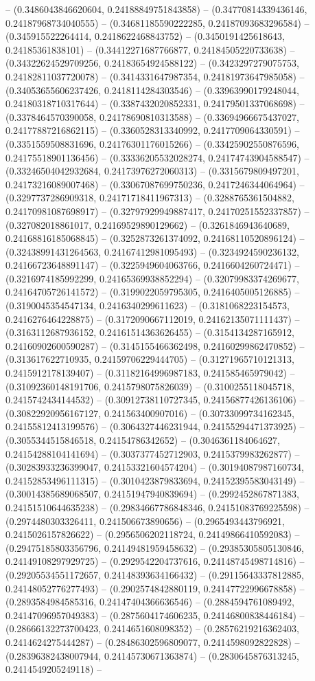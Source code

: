 -- (0.3486043846620604, 0.24188849751843858) -- (0.34770814339436146, 0.24187968734040555) -- (0.34681185590222285, 0.24187093683296584) -- (0.345915522264414, 0.2418622468843752) -- (0.3450191425618643, 0.24185361838101) -- (0.34412271687766877, 0.24184505220733638) -- (0.34322624529709256, 0.24183654924588122) -- (0.3423297279075753, 0.24182811037720078) -- (0.3414331647987354, 0.24181973647985058) -- (0.34053655606237426, 0.2418114284303546) -- (0.33963990179248044, 0.24180318710317644) -- (0.3387432020852331, 0.24179501337068698) -- (0.3378464570390058, 0.24178690810313588) -- (0.33694966675437027, 0.24177887216862115) -- (0.3360528313340992, 0.2417709064330591) -- (0.3351559508831696, 0.24176301176015266) -- (0.33425902550876596, 0.24175518901136456) -- (0.33336205532028274, 0.24174743904588547) -- (0.33246504042932684, 0.24173976272060313) -- (0.3315679809497201, 0.24173216089007468) -- (0.33067087699750236, 0.2417246344064964) -- (0.3297737286909318, 0.24171718411967313) -- (0.3288765361504882, 0.24170981087698917) -- (0.32797929949887417, 0.24170251552337857) -- (0.327082018861017, 0.24169529890129662) -- (0.3261846943640689, 0.24168816185068845) -- (0.3252873261374092, 0.24168110520896124) -- (0.32438991431264563, 0.24167412981095493) -- (0.3234924590236132, 0.24166723648891147) -- (0.3225949604063766, 0.2416604260724471) -- (0.3216974185992299, 0.24165369938852294) -- (0.32079983374269677, 0.24164705726141572) -- (0.3199022059795305, 0.2416405005126885) -- (0.3190045354547134, 0.2416340299611623) -- (0.3181068223154573, 0.2416276464228875) -- (0.3172090667112019, 0.24162135071111437) -- (0.3163112687936152, 0.24161514363626455) -- (0.3154134287165912, 0.24160902600590287) -- (0.3145155466362498, 0.24160299862470852) -- (0.313617622710935, 0.24159706229444705) -- (0.31271965710121313, 0.2415912178139407) -- (0.31182164996987183, 0.241585465979042) -- (0.31092360148191706, 0.2415798075826039) -- (0.3100255118045718, 0.2415742434144532) -- (0.30912738110727345, 0.24156877426136106) -- (0.30822920956167127, 0.241563400907016) -- (0.30733099734162345, 0.24155812413199576) -- (0.3064327446231944, 0.24155294471373925) -- (0.3055344515846518, 0.24154786342652) -- (0.3046361184064627, 0.24154288104141694) -- (0.3037377452712903, 0.2415379983262877) -- (0.30283933236399047, 0.24153321604574204) -- (0.30194087987160734, 0.24152853496111315) -- (0.3010423879833694, 0.24152395583043149) -- (0.30014385689068507, 0.24151947940839694) -- (0.2992452867871383, 0.24151510644635238) -- (0.29834667786848346, 0.24151083769225598) -- (0.2974480303326411, 0.241506673890656) -- (0.2965493443796921, 0.2415026157826622) -- (0.2956506202118724, 0.24149866410592083) -- (0.29475185803356796, 0.24149481959458632) -- (0.29385305805130846, 0.24149108297929725) -- (0.2929542204737616, 0.24148745498714816) -- (0.29205534551172657, 0.24148393634166432) -- (0.29115643337812885, 0.24148052776277493) -- (0.2902574842880119, 0.24147722996678858) -- (0.2893584984585316, 0.24147404366636546) -- (0.2884594761089492, 0.24147096957049383) -- (0.2875604174606235, 0.24146800838446184) -- (0.28666132273700423, 0.2414651608098352) -- (0.28576219216362403, 0.2414624275444287) -- (0.28486302596809077, 0.2414598092822828) -- (0.28396382438007944, 0.24145730671363874) -- (0.2830645876313245, 0.2414549205249118) -- 